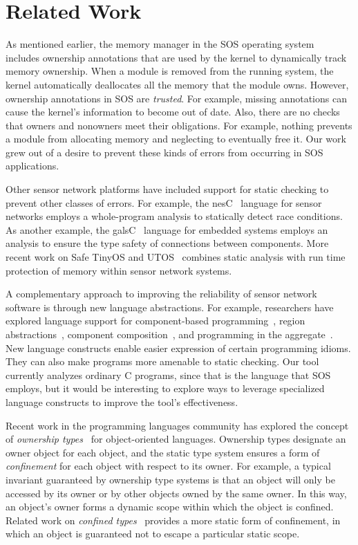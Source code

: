 \section{Related Work}
\label{sec:related}


As mentioned earlier, the memory manager in the SOS operating
system~\cite{sos} includes ownership annotations that are used by the kernel
to dynamically track memory ownership.  When a module is removed from the
running system, the kernel automatically deallocates all the memory that the
module owns.  However, ownership annotations in SOS are {\em trusted}.  For
example, missing annotations can cause the kernel's information to become out
of date.  Also, there are no checks that owners and nonowners meet their
obligations.  For example, nothing prevents a module from allocating memory
and neglecting to eventually free it.  Our work grew out of a desire to
prevent these kinds of errors from occurring in SOS applications.


Other sensor network platforms have included support for static
checking to prevent other classes of errors.  For example, the
nesC~\cite{nesC} language for sensor networks employs a whole-program
analysis to statically detect race conditions.  As another example,
the galsC~\cite{TinyGALS, galsC} language for embedded systems employs
an analysis to ensure the type safety of connections between
components.  More recent work on Safe TinyOS and
UTOS~\cite{regehr06memory} combines static analysis with run time
protection of memory within sensor network systems.


A complementary approach to improving the reliability of sensor
network software is through new language abstractions.  For example,
researchers have explored language support for component-based
programming~\cite{TinyOS,nesC,galsC}, region
abstractions~\cite{conf/mobisys/WhitehouseSCB04,conf/nsdi/WelshM04},
component composition~\cite{conf/sensys/GreensteinKE04}, and
programming in the aggregate~\cite{1052213,conf/dcoss/GummadiGG05}.
New language constructs enable easier expression of certain
programming idioms.  They can also make programs more amenable to
static checking.  Our tool currently analyzes ordinary C programs,
since that is the language that SOS employs, but it would be
interesting to explore ways to leverage specialized language
constructs to improve the tool's effectiveness.


Recent work in the programming languages community has explored the
concept of {\em ownership
types}~\cite{ownership,ownership2,BoyapatiEtAl02,aliasjava} for
object-oriented languages.  Ownership types designate an owner object
for each object, and the static type system ensures a form of {\em
confinement} for each object with respect to its owner.  For example,
a typical invariant guaranteed by ownership type systems is that an
object will only be accessed by its owner or by other objects owned by
the same owner.  In this way, an object's owner forms a dynamic scope
within which the object is confined.  Related work on {\em confined
types}~\cite{confined1,confined2} provides a more static form of
confinement, in which an object is guaranteed not to escape a
particular static scope.


